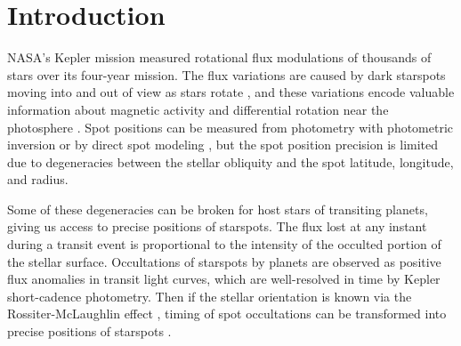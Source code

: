 \documentclass[iop]{emulateapj}
\begin{document}



\section{Introduction}

NASA’s Kepler mission measured rotational flux modulations of thousands of stars over its four-year mission. The flux variations are caused by dark starspots moving into and out of view as stars rotate \citep{McQuillan2014}, and these variations encode valuable information about magnetic activity and differential rotation near the photosphere \citep{Davenport2015}. Spot positions can be measured from photometry with photometric inversion \citep{Roettenbacher2013} or by direct spot modeling \citep{Frasca2011}, but the spot position precision is limited due to degeneracies between the stellar obliquity and the spot latitude, longitude, and radius. 

Some of these degeneracies can be broken for host stars of transiting planets, giving us access to precise positions of starspots. The flux lost at any instant during a transit event is proportional to the intensity of the occulted portion of the stellar surface. Occultations of starspots by planets are observed as positive flux anomalies in transit light curves, which are well-resolved in time by Kepler short-cadence photometry. Then if the stellar orientation is known via the Rossiter-McLaughlin effect \citep{Ohta2005, Winn2005}, timing of spot occultations can be transformed into precise positions of starspots \citep{Sanchis-Ojeda2011}.
\end{document}
